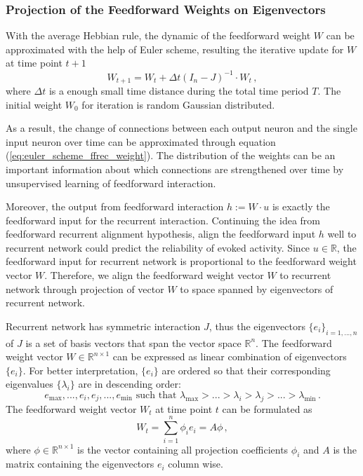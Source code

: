 \documentclass[11pt]{article}
\begin{document}
	\subsubsection{Projection of the Feedforward Weights on Eigenvectors}
	With the average Hebbian rule, the dynamic of the feedforward weight $W$ can be approximated with the help of Euler scheme, resulting the iterative update for $W$ at time point $t+1$
		\begin{equation} \label{eq:euler_scheme_ffrec_weight}
			W_{t+1} = W_t + \Delta t (I_n - J)^{-1} \cdot W_t \, , 
		\end{equation}
	where $\Delta t$ is a enough small time distance during the total time period $T$. The initial weight $W_0$ for iteration is random Gaussian distributed.
	
	As a result, the change of connections between each output neuron and the single input neuron over time can be approximated through equation (\ref{eq:euler_scheme_ffrec_weight}). The distribution of the weights can be an important information about which connections are strengthened over time by unsupervised learning of feedforward interaction. 
	
	Moreover, the output from feedforward interaction $h := W \cdot u$ is exactly the feedforward input for the recurrent interaction.  Continuing the idea from feedforward recurrent alignment hypothesis, align the feedforward input $h$ well to recurrent network could predict the reliability of evoked activity. Since $u \in \mathbb{R}$, the feedforward input for recurrent network is proportional to the feedforward weight vector $W$. Therefore, we align the feedforward weight vector $W$ to recurrent network through projection of vector $W$ to space spanned by eigenvectors of recurrent network. 
	
	Recurrent network has symmetric interaction $J$, thus the eigenvectors $\{e_i\}_{i = 1, ..., n}$ of $J$ is a set of basis vectors that span the vector space $\mathbb{R}^n$. The feedforward weight vector $W \in \mathbb{R}^{n \times 1}$ can be expressed as linear combination of eigenvectors $\{e_i\}$. For better interpretation, $\{e_i\}$ are ordered so that their corresponding eigenvalues $\{\lambda_i\}$ are in descending order:
		\begin{equation}
			e_{\text{max}}, ..., e_i, e_j, ..., e_{\text{min}} \, \, \text{such that} \, \, \lambda_{\text{max}} > ...> \lambda_i > \lambda_j > ... > \lambda_{\text{min}} \, .
		\end{equation} 
	The feedforward weight vector $W_t$ at time point $t$ can be formulated as
		\begin{equation} \label{eq:linear_combi_weight}
			W_t = \sum_{i = 1}^{n} \phi_i e_i = A \phi \, ,
		\end{equation}
	where $\phi \in \mathbb{R}^{n \times 1}$ is the vector containing all projection coefficients $\phi_i$ and $A$ is the matrix containing the eigenvectors $e_i$ column wise.  
	
\end{document}
